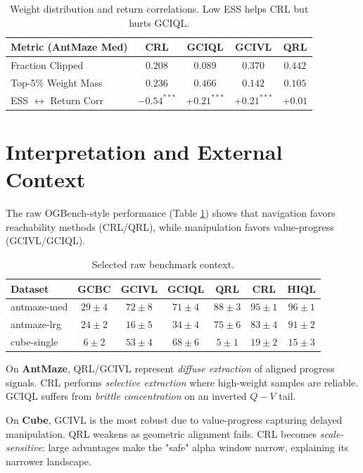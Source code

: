 \documentclass[11pt]{article}
\begin{document}
\begin{table}[htb]
\centering
\small
\renewcommand{\arraystretch}{1.1}
\begin{tabular}{lcccc}
\toprule
Metric (AntMaze Med) & CRL & GCIQL & GCIVL & QRL \\
\midrule
Fraction Clipped & $0.208$ & $0.089$ & $0.370$ & $0.442$ \\
Top-5\% Weight Mass & $0.236$ & $0.466$ & $0.142$ & $0.105$ \\
ESS $\leftrightarrow$ Return Corr & $-0.54^{***}$ & $+0.21^{***}$ & $+0.21^{***}$ & $+0.01$ \\
\bottomrule
\end{tabular}
\caption{Weight distribution and return correlations. Low ESS helps CRL but hurts GCIQL.}
\end{table}

\section{Interpretation and External Context}

The raw OGBench-style performance (Table \ref{tab:bench}) shows that navigation favors reachability methods (CRL/QRL), while manipulation favors value-progress (GCIVL/GCIQL).

\begin{table}[htb]
\centering
\small
\label{tab:bench}
\begin{tabular}{lcccccc}
\toprule
Dataset & GCBC & GCIVL & GCIQL & QRL & CRL & HIQL \\
\midrule
antmaze-med & $29\pm4$ & $72\pm8$ & $71\pm4$ & $88\pm3$ & $95\pm1$ & $96\pm1$ \\
antmaze-lrg & $24\pm2$ & $16\pm5$ & $34\pm4$ & $75\pm6$ & $83\pm4$ & $91\pm2$ \\
cube-single & $6\pm2$  & $53\pm4$ & $68\pm6$ & $5\pm1$  & $19\pm2$ & $15\pm3$ \\
\bottomrule
\end{tabular}
\caption{Selected raw benchmark context.}
\end{table}

On \textbf{AntMaze}, QRL/GCIVL represent \textit{diffuse extraction} of aligned progress signals. CRL performs \textit{selective extraction} where high-weight samples are reliable. GCIQL suffers from \textit{brittle concentration} on an inverted $Q-V$ tail.

On \textbf{Cube}, GCIVL is the most robust due to value-progress capturing delayed manipulation. QRL weakens as geometric alignment fails. CRL becomes \textit{scale-sensitive}: large advantages make the "safe" alpha window narrow, explaining its narrower landscape.
\end{document}

